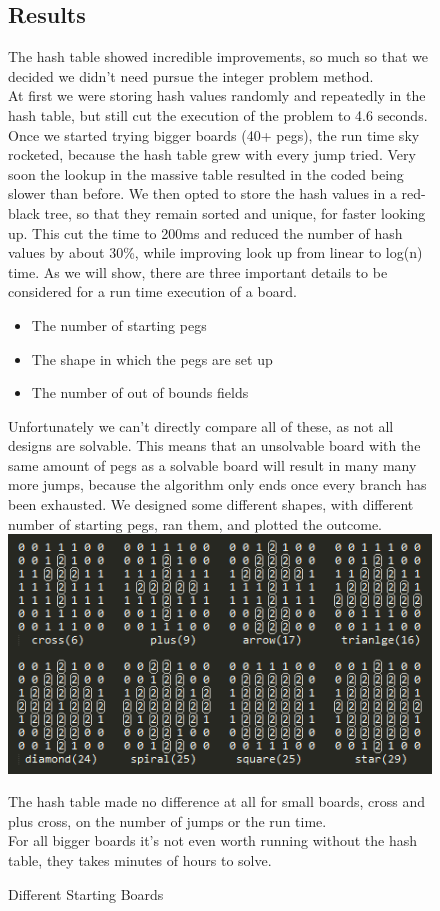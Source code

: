\documentclass[11pt]{article}
\begin{document}
\newpage
\begin{figure}
\subsection{Results}
The hash table showed incredible improvements, so much so that we decided we didn't need pursue the integer problem method.\\
At first we were storing hash values randomly and repeatedly in the hash table, but still cut the execution of the problem to 4.6 seconds. Once we started trying bigger boards (40+ pegs), the run time sky rocketed, because the hash table grew with every jump tried. Very soon the lookup in the massive table resulted in the coded being slower than before.
We then opted to store the hash values in a red-black tree, so that they remain sorted and unique, for faster looking up.
This cut the time to 200ms and reduced the number of hash values by about 30\%, while improving look up from linear to log(n) time.\newline
As we will show, there are three important details to be considered for a run time execution of a board.
\begin{itemize}
\item The number of starting pegs
\item The shape in which the pegs are set up
\item The number of out of bounds fields
\end{itemize}
Unfortunately we can't directly compare all of these, as not all designs are solvable. This means that an unsolvable board with the same amount of pegs as a solvable board will result in many many more jumps, because the algorithm only ends once every branch has been exhausted.\newline
We designed some different shapes, with different number of starting pegs, ran them, and plotted the outcome.
\includegraphics[width=12cm]{5}
\caption{Different Starting Boards} 
\label{fig: 5}
The hash table made no difference at all for small boards, cross and plus cross, on the number of jumps or the run time.\\
For all bigger boards it's not even worth running without the hash table, they takes minutes of hours to solve.\\
\end{figure}
\newpage
\end{document}

